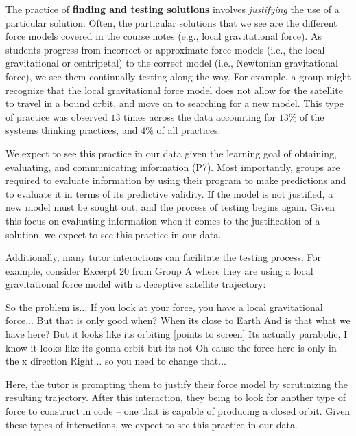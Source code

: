 \documentclass{msuphddissertation}
\begin{document}
\begin{doublespace}
The practice of \textbf{finding and testing solutions} involves \textit{justifying} the use of a particular solution.  Often, the particular solutions that we see are the different force models covered in the course notes (e.g., local gravitational force).  As students progress from incorrect or approximate force models (i.e., the local gravitational or centripetal) to the correct model (i.e., Newtonian gravitational force), we see them continually testing along the way.  For example, a group might recognize that the local gravitational force model does not allow for the satellite to travel in a bound orbit, and move on to searching for a new model.  This type of practice was observed $13$ times across the data  accounting for $13\%$ of the systems thinking practices, and $4\%$ of all practices.

We expect to see this practice in our data given the learning goal of obtaining, evaluating, and communicating information (P7).  Most importantly, groups are required to evaluate information by using their program to make predictions and to evaluate it in terms of its predictive validity.  If the model is not justified, a new model must be sought out, and the process of testing begins again.  Given this focus on evaluating information when it comes to the justification of a solution, we expect to see this practice in our data.

Additionally, many tutor interactions can facilitate the testing process.  For example, consider Excerpt 20 from Group A where they are using a local gravitational force model with a deceptive satellite trajectory: \begin{description}
\TA So the problem is...
\TA If you look at your force, you have a local gravitational force...
\TA But that is only good when?
\SB When its close to Earth
\TA And is that what we have here?
\SA But it looks like its orbiting [points to screen]
\TA Its actually parabolic, I know it looks like its gonna orbit but its not
\SB Oh cause the force here is only in the x direction
\TA Right... so you need to change that...
\end{description}  Here, the tutor is prompting them to justify their force model by scrutinizing the resulting trajectory.  After this interaction, they being to look for another type of force to construct in code -- one that is capable of producing a closed orbit.  Given these types of interactions, we expect to see this practice in our data.


\end{doublespace}
\end{document}
